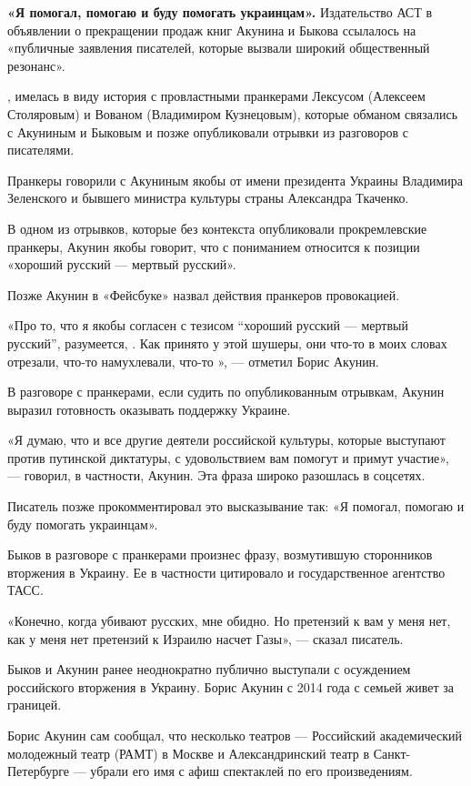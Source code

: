 \textbf{«Я помогал, помогаю и буду помогать украинцам».}
Издательство АСТ в объявлении о прекращении продаж книг
Акунина и Быкова ссылалось на «публичные заявления писателей,
которые вызвали широкий общественный резонанс».

,
имелась в виду история с провластными пранкерами Лексусом
(Алексеем Столяровым) и Вованом (Владимиром Кузнецовым),
которые обманом связались с Акуниным и Быковым и позже
опубликовали отрывки из разговоров с писателями.

Пранкеры говорили с Акуниным якобы от имени президента
Украины Владимира Зеленского и бывшего министра культуры страны
Александра Ткаченко.

В одном из отрывков, которые без контекста опубликовали
прокремлевские пранкеры, Акунин якобы говорит,
что с пониманием относится к позиции
«хороший русский --- мертвый русский».

Позже Акунин в «Фейсбуке» назвал действия пранкеров провокацией.

«Про то, что я якобы согласен с тезисом ``хороший русский
--- мертвый русский'', разумеется, .
Как принято у этой шушеры, они что-то в моих словах отрезали,
что-то намухлевали, что-то »,
--- отметил Борис Акунин.

В разговоре с пранкерами, если судить по опубликованным отрывкам,
Акунин выразил готовность оказывать поддержку Украине.

«Я думаю, что и все другие деятели российской культуры,
которые выступают против путинской диктатуры,
с удовольствием вам помогут и примут участие»,
--- говорил, в частности, Акунин.
Эта фраза широко разошлась в соцсетях.

Писатель позже прокомментировал это высказывание так:
«Я помогал, помогаю и буду помогать украинцам».

Быков в разговоре с пранкерами произнес фразу,
возмутившую сторонников вторжения в Украину.
Ее в частности цитировало и государственное агентство ТАСС.

«Конечно, когда убивают русских, мне обидно.
Но претензий к вам у меня нет, как у меня нет претензий
к Израилю насчет Газы», — сказал писатель.

Быков и Акунин ранее неоднократно публично выступали
с осуждением российского вторжения в Украину.
Борис Акунин с 2014 года с семьей живет за границей.

Борис Акунин сам сообщал, что несколько театров
--- Российский академический молодежный театр (РАМТ)
в Москве и Александринский театр в Санкт-Петербурге
--- убрали его имя с афиш спектаклей по его произведениям.

